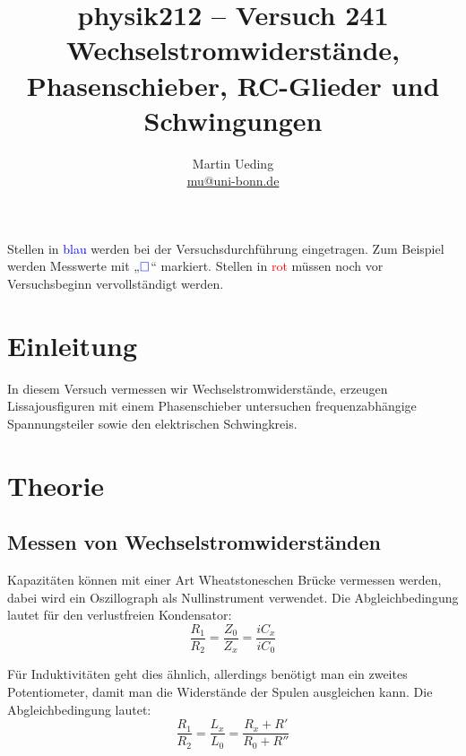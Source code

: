 \documentclass[11pt, ngerman]{article}
\title{physik212 -- Versuch 241 \\ Wechselstromwiderstände, Phasenschieber, RC-Glieder und Schwingungen}
\author{Martin Ueding \\ {\small \href{mailto:mu@uni-bonn.de}{mu@uni-bonn.de}}}
\newcommand{\messwert}{\textcolor{blue}{\square}}
\begin{document}
\maketitle

\tableofcontents

\vfill

\begin{small}
	Stellen in \textcolor{blue}{blau} werden bei der Versuchsdurchführung
	eingetragen. Zum Beispiel werden Messwerte mit „$\messwert$“ markiert.
	Stellen in \textcolor{red}{rot} müssen noch vor Versuchsbeginn
	vervollständigt werden.
\end{small}

\newpage


\section{Einleitung}

In diesem Versuch vermessen wir Wechselstromwiderstände, erzeugen
Lissajousfiguren mit einem Phasenschieber untersuchen frequenzabhängige
Spannungsteiler sowie den elektrischen Schwingkreis.


\section{Theorie}

\subsection{Messen von Wechselstromwiderständen}

Kapazitäten können mit einer Art Wheatstoneschen Brücke vermessen werden, dabei
wird ein Oszillograph als Nullinstrument verwendet. Die Abgleichbedingung
lautet für den verlustfreien Kondensator:
\[ \frac{R_1}{R_2} = \frac{Z_0}{Z_x} = \frac{iC_x}{iC_0} \]

Für Induktivitäten geht dies ähnlich, allerdings benötigt man ein zweites
Potentiometer, damit man die Widerstände der Spulen ausgleichen kann. Die
Abgleichbedingung lautet:
\[ \frac{R_1}{R_2} = \frac{L_x}{L_0} = \frac{R_x + R'}{R_0 + R''} \]
\end{document}
